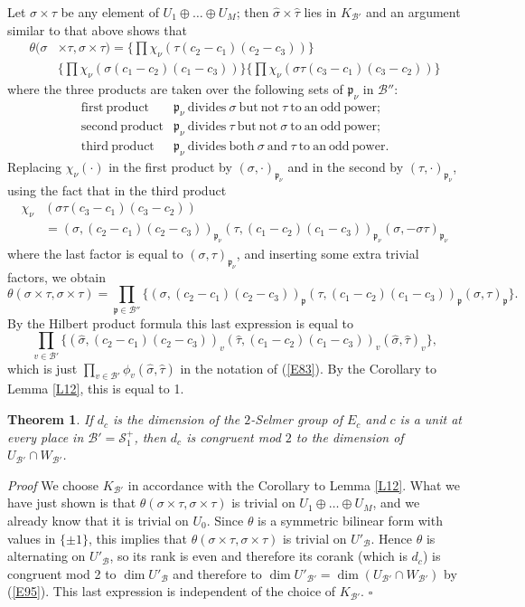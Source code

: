 \documentclass[12pt]{article}
\def\fp{{\mathfrak p}}
\def\gs{{\sigma}}
\def\gt{{\theta}}
\def\sB{{\mathcal B}}
\def\sS{{\mathcal S}}
\def\qed{{\hfill$\square$}}
\def\beq{\begin{equation} \label}
\def\bth{\begin{theorem} \label}
\def\eth{\end{theorem}}
\newtheorem{theorem}{Theorem}
\begin{document}
Let $\gs\times\tau$ be any element of $U_1\oplus\ldots\oplus U_M$;
then $\hat{\gs}\times\hat{\tau}$ lies in $K_{\sB'}$ and an
argument similar to that above shows that
\begin{align*} \gt(\gs & \times\tau,\gs\times\tau)=\bigl\{\prod\chi_\nu(\tau(c_2-c_1)(c_2-c_3))\bigr\} \\
 & \bigl\{\prod\chi_\nu(\gs(c_1-c_2)(c_1-c_3))\bigr\}\bigl\{\prod\chi_\nu(\gs\tau(c_3-c_1)(c_3-c_2))\bigr\} \end{align*}
where the three products are taken over the following sets of
$\fp_\nu$ in $\sB''$:
\[ \begin{matrix}
{\mathrm{first~product}} & \fp_\nu {\mathrm{~divides~}}\gs {\mathrm{~but~not~}} \tau {\mathrm{~to~an~odd~power;}} \\
{\mathrm{second~product}} & \fp_\nu {\mathrm{~divides~}}\tau {\mathrm{~but~not~}} \gs {\mathrm{~to~an~odd~power;}} \\
{\mathrm{third~product}} & \fp_\nu {\mathrm{~divides~both~}}\gs {\mathrm{~and~}} \tau {\mathrm{~to~an~odd~power.}}
\end{matrix} \]
Replacing $\chi_\nu(\cdot)$ in the first product by $(\gs,\cdot)_{\fp_\nu}$ and in the
second by $(\tau,\cdot)_{\fp_\nu}$, using the fact that in the third product
\begin{align*} \chi_\nu & (\gs\tau(c_3-c_1)(c_3-c_2)) \\
 & =(\gs,(c_2-c_1)(c_2-c_3))_{\fp_\nu}(\tau,(c_1-c_2)(c_1-c_3))_{\fp_\nu}(\gs,-\gs\tau)_{\fp_\nu}
\end{align*} 
where the last factor is equal to $(\gs,\tau)_{\fp_\nu}$, and
inserting some extra trivial factors, we obtain
\[ \gt(\gs\times\tau,\gs\times\tau)=\prod_{\fp\in \sB''}\{(\gs,(c_2-c_1)
(c_2-c_3))_\fp(\tau,(c_1-c_2)(c_1-c_3))_\fp(\gs,\tau)_\fp\}. \]
By the Hilbert product formula this last expression is equal to
\beq{E51} \prod_{v\in \sB'}\{(\hat{\gs},(c_2-c_1)(c_2-c_3))_v
(\hat{\tau},(c_1-c_2)(c_1-c_3))_v(\hat{\gs},\hat{\tau})_v\},
\end{equation}
which is just $\prod_{v\in\sB'}\phi_v(\hat{\gs},\hat{\tau})$
in the notation of (\ref{E83}). By the Corollary to Lemma
\ref{L12}, this is equal to 1.
\bth{T20} If $d_c$ is the dimension of the $2$-Selmer group
of $E_c$ and
$c$ is a unit at every place in $\sB'=\sS^+_1$, then $d_c$ is
congruent mod $2$ to
the dimension of $U_{\sB'}\cap W_{\sB'}$.
\eth
\emph{Proof} We choose $K_{\sB'}$ in accordance with the
Corollary to Lemma \ref{L12}. What we have just shown is that
$\gt(\gs\times\tau,\gs\times\tau)$ is trivial on
$U_1\oplus\ldots\oplus U_M$, and we already know that it is
trivial on $U_0$. Since $\gt$ is a symmetric bilinear form
with values in $\{\pm1\}$,
this implies that $\gt(\gs\times\tau,\gs\times\tau)$ is
trivial on $U'_\sB$. Hence $\gt$ is alternating on $U'_\sB$,
so its rank is even and therefore its corank (which is $d_c$)
is congruent mod 2 to $\dim U'_\sB$ and therefore
to $\dim U'_{\sB'}=\dim(U_{\sB'}\cap W_{\sB'})$ by (\ref{E95}).
This last
expression is independent of the choice of $K_{\sB'}$.  \qed
\end{document}
